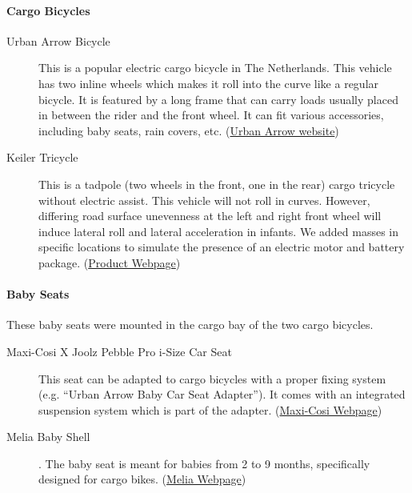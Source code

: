 \documentclass[a4paper]{article}
\begin{document}
\paragraph{Cargo Bicycles}
%
\begin{description}
  \item[Urban Arrow Bicycle] This is a popular electric cargo bicycle in The
  Netherlands. This vehicle has two inline wheels which makes it roll into the
  curve like a regular bicycle. It is featured by a long frame that can carry
  loads usually placed in between the rider and the front wheel. It can fit
  various accessories, including baby seats, rain covers, etc.
  (\href{https://urbanarrow.com/}{Urban Arrow website})
  \item[Keiler Tricycle] This is a tadpole (two wheels in the front, one in the
  rear) cargo tricycle without electric assist. This vehicle will not roll in
  curves. However, differing road surface unevenness at the left and right front
  wheel will induce lateral roll and lateral acceleration in infants. We
  added masses in specific locations to simulate the presence of an electric
  motor and battery package.
 (\href{https://kashop.nl/product/keiler-bakfiets/}{Product Webpage}) 
\end{description}
  
\paragraph{Baby Seats}

These baby seats were mounted in the cargo bay of the two cargo bicycles.
%
\begin{description}
  \item[Maxi-Cosi X Joolz Pebble Pro i-Size Car Seat] This seat can be adapted to
    cargo bicycles with a proper fixing system (e.g. ``Urban Arrow Baby Car Seat
    Adapter''). It comes with an integrated suspension system which is part of
    the adapter.
    (\href{https://www.maxi-cosi.nl/autostoelen/pebble-pro-i-size}{Maxi-Cosi Webpage})
  \item[Melia Baby Shell]. The baby seat is meant for babies from 2 to 9 months,
    specifically designed for cargo bikes.
    (\href{https://melia.nl/product/babyschaal-4-seizoenen-comfort/}{Melia Webpage})
\end{description}
\end{document}

